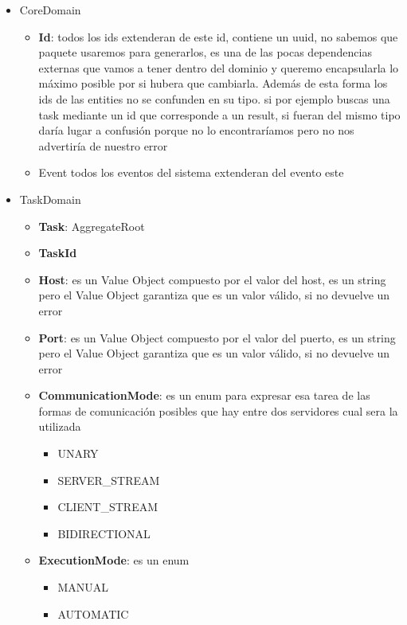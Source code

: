 \begin{itemize}
    \item CoreDomain
        \begin{itemize}
            \item \textbf{Id}: todos los ids extenderan de este id, contiene un uuid, no sabemos que paquete usaremos para generarlos, es una de las pocas dependencias externas que vamos a tener dentro del dominio y queremo encapsularla lo máximo posible por si hubera que cambiarla. Además de esta forma los ids de las entities no se confunden en su tipo. si por ejemplo buscas una task mediante un id que corresponde a un result, si fueran del mismo tipo daría lugar a confusión porque no lo encontraríamos pero no nos advertiría de nuestro error
            \item Event todos los eventos del sistema extenderan del evento este
        \end{itemize}
    \item TaskDomain
        \begin{itemize}
        \item \textbf{Task}: AggregateRoot
        \item \textbf{TaskId}
        \item \textbf{Host}: es un Value Object compuesto por el valor del host, es un string pero el Value Object garantiza que es un valor válido, si no devuelve un error
        \item \textbf{Port}: es un Value Object compuesto por el valor del puerto, es un string pero el Value Object garantiza que es un valor válido, si no devuelve un error
        \item \textbf{CommunicationMode}: es un enum para expresar esa tarea de las formas de comunicación posibles que hay entre dos servidores cual sera la utilizada
            \begin{itemize}
                \item UNARY
                \item SERVER\_STREAM
                \item CLIENT\_STREAM
                \item BIDIRECTIONAL
            \end{itemize}
        \item \textbf{ExecutionMode}: es un enum
        \begin{itemize}
            \item MANUAL
            \item AUTOMATIC
        \end{itemize}

\end{itemize}
\end{itemize}
